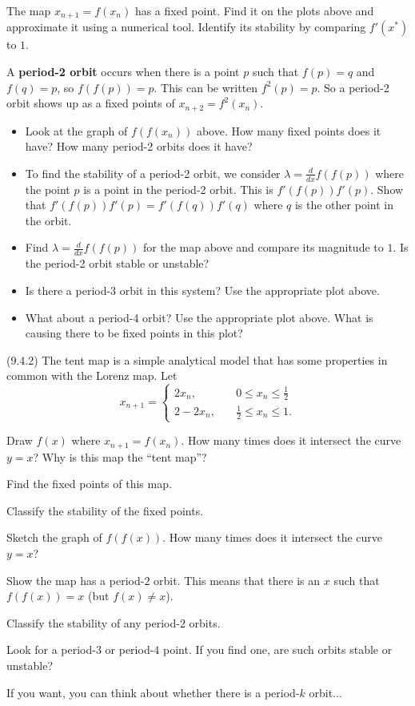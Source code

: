 \documentclass[12pt,letterpaper,noanswers]{exam}
\begin{document}
\begin{questions}
\begin{parts}
\item The map $x_{n+1} = f(x_n)$ has a fixed point.  Find it on the plots above and approximate it using a numerical tool.  Identify its stability by comparing $f'(x^*)$ to $1$.
\item A \textbf{period-2 orbit} occurs when there is a point $p$ such that $f(p) = q$ and $f(q) = p$, so $f(f(p)) = p$.  This can be written $f^2(p) = p$.  So a period-2 orbit shows up as a fixed points of $x_{n+2} = f^2(x_n)$.
\begin{itemize}
\item Look at the graph of $f(f(x_n))$ above.  How many fixed points does it have?  How many period-2 orbits does it have?
\item To find the stability of a period-2 orbit, we consider $\lambda = \frac{d}{dx} f(f(p))$ where the point $p$ is a point in the period-2 orbit.  This is $f'(f(p))f'(p)$.  Show that $f'(f(p))f'(p) = f'(f(q))f'(q)$ where $q$ is the other point in the orbit.
\item Find $\lambda = \frac{d}{dx} f(f(p))$ for the map above and compare its magnitude to $1$.  Is the period-2 orbit stable or unstable?
\item Is there a period-3 orbit in this system?  Use the appropriate plot above.
\item What about a period-4 orbit?  Use the appropriate plot above.  What is causing there to be fixed points in this plot?
\end{itemize}
\end{parts}


\question (9.4.2) The tent map is a simple analytical model that has some properties in common with the Lorenz map.
Let \[
x_{n+1} = \left\{
        \begin{array}{ll}
            2x_n, & \quad 0\leq x_n \leq \frac{1}{2} \\
            2-2x_n, & \quad \frac{1}{2}\leq x_n \leq 1.
        \end{array}
    \right.
    \]
    \begin{parts}
    \item Draw $f(x)$ where $x_{n+1} = f(x_n)$.  How many times does it intersect the curve $y=x$?  Why is this map the ``tent map''?
    \item Find the fixed points of this map.
    \item Classify the stability of the fixed points.
    \item Sketch the graph of $f(f(x))$.  How many times does it intersect the curve $y = x$?
    \item Show the map has a period-$2$ orbit.  This means that there is an $x$ such that $f(f(x)) = x$ (but $f(x)\neq x$).
    \item Classify the stability of any period-$2$ orbits.
    \item Look for a period-$3$ or period-$4$ point.  If you find one, are such orbits stable or unstable?
    \item If you want, you can think about whether there is a period-$k$ orbit...
    \end{parts}


\end{questions}
\end{document}
